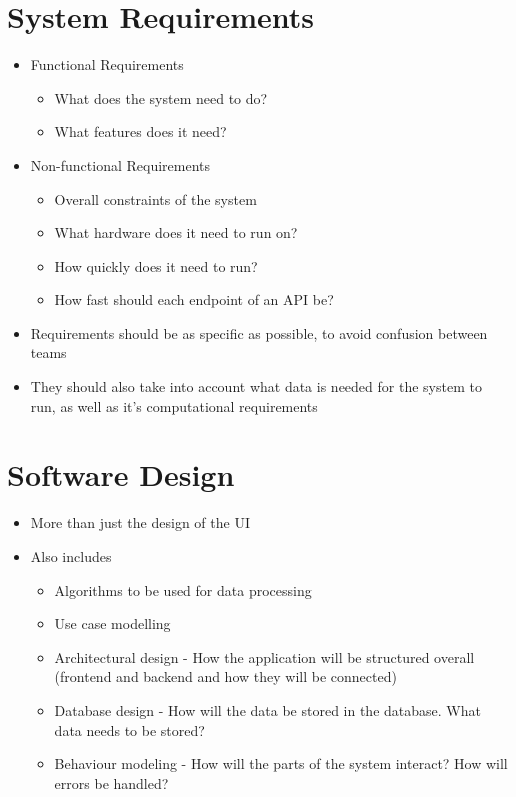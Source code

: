 
\section*{System Requirements}

\begin{itemize}
  \item Functional Requirements
  \begin{itemize}
    \item What does the system need to do?
    \item What features does it need?
  \end{itemize}
  \item Non-functional Requirements
  \begin{itemize}
    \item Overall constraints of the system
    \item What hardware does it need to run on?
    \item How quickly does it need to run?
    \item How fast should each endpoint of an API be?
  \end{itemize}
  \item Requirements should be as specific as possible, to avoid confusion between teams
  \item They should also take into account what data is needed for the system to run, as well as it's computational requirements
\end{itemize}

\section*{Software Design}

\begin{itemize}
  \item More than just the design of the UI
  \item Also includes
  \begin{itemize}
    \item Algorithms to be used for data processing
    \item Use case modelling
    \item Architectural design - How the application will be structured overall (frontend and backend and how they will be connected)
    \item Database design - How will the data be stored in the database. What data needs to be stored?
    \item Behaviour modeling - How will the parts of the system interact? How will errors be handled?
  \end{itemize}
\end{itemize}

